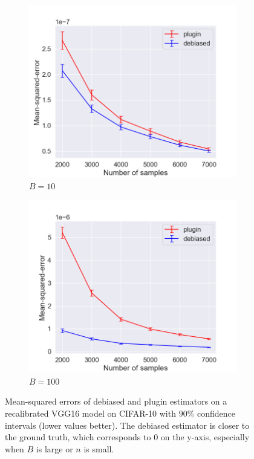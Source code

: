 \begin{figure}
  \centering
  \centering
     \begin{subfigure}[b]{0.45\textwidth}
         \centering
         \includegraphics[width=\textwidth]{images/mse_estimator_10_bins.png}
         \caption{$B = 10$
         }
         \label{fig:mse_estimators}
     \end{subfigure}
     \hfill
     \begin{subfigure}[b]{0.45\textwidth}
         \centering
         \includegraphics[width=\textwidth]{images/mse_estimator_100_bins.png}
         \caption{$B = 100$
         }
         \label{fig:ce_vs_bins_verifying}
     \end{subfigure}
  \caption{
    Mean-squared errors of debiased and plugin estimators on a recalibrated VGG16 model on CIFAR-10 with $90\%$ confidence intervals (lower values better). The debiased estimator is closer to the ground truth, which corresponds to $0$ on the y-axis, especially when $B$ is large or $n$ is small.
}
  \label{fig:mse_estimators_bins}
\end{figure}

